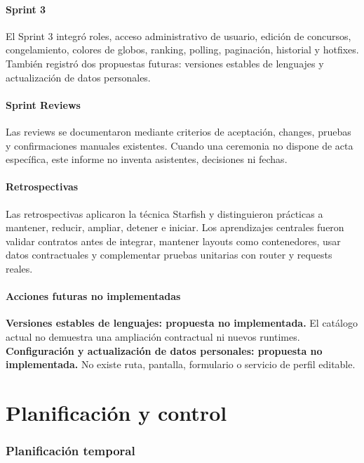 \documentclass[11pt,a4paper]{article}
\begin{document}
\subsection{Sprint 3}
El Sprint 3 integró roles, acceso administrativo de usuario, edición de concursos, congelamiento, colores de globos, ranking, polling, paginación, historial y hotfixes. También registró dos propuestas futuras: versiones estables de lenguajes y actualización de datos personales.

\subsection{Sprint Reviews}
Las reviews se documentaron mediante criterios de aceptación, changes, pruebas y confirmaciones manuales existentes. Cuando una ceremonia no dispone de acta específica, este informe no inventa asistentes, decisiones ni fechas.

\subsection{Retrospectivas}
Las retrospectivas aplicaron la técnica Starfish y distinguieron prácticas a mantener, reducir, ampliar, detener e iniciar. Los aprendizajes centrales fueron validar contratos antes de integrar, mantener layouts como contenedores, usar datos contractuales y complementar pruebas unitarias con router y requests reales.

\subsection{Acciones futuras no implementadas}
\begin{notebox}
\textbf{Versiones estables de lenguajes: propuesta no implementada.} El catálogo actual no demuestra una ampliación contractual ni nuevos runtimes.\\[0.25cm]
\textbf{Configuración y actualización de datos personales: propuesta no implementada.} No existe ruta, pantalla, formulario o servicio de perfil editable.
\end{notebox}

\part{Planificación y control}

\section{Planificación temporal}
\end{document}
